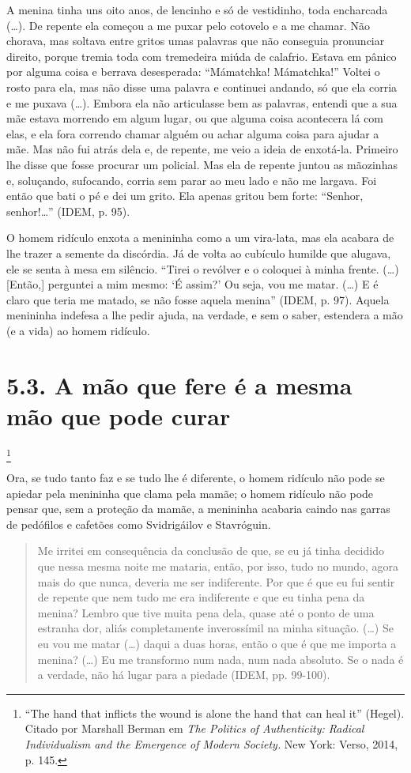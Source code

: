 A menina tinha uns oito anos, de lencinho e só de vestidinho, toda
encharcada (\ldots{}). De repente ela começou a me puxar pelo cotovelo e
a me chamar. Não chorava, mas soltava entre gritos umas palavras que não
conseguia pronunciar direito, porque tremia toda com tremedeira miúda de
calafrio. Estava em pânico por alguma coisa e berrava desesperada:
``Mámatchka! Mámatchka!'' Voltei o rosto para ela, mas não disse uma
palavra e continuei andando, só que ela corria e me puxava (\ldots{}).
Embora ela não articulasse bem as palavras, entendi que a sua mãe estava
morrendo em algum lugar, ou que alguma coisa acontecera lá com elas, e
ela fora correndo chamar alguém ou achar alguma coisa para ajudar a mãe.
Mas não fui atrás dela e, de repente, me veio a ideia de enxotá-la.
Primeiro lhe disse que fosse procurar um policial. Mas ela de repente
juntou as mãozinhas e, soluçando, sufocando, corria sem parar ao meu
lado e não me largava. Foi então que bati o pé e dei um grito. Ela
apenas gritou bem forte: ``Senhor, senhor!\ldots{}'' (IDEM, p. 95).

O homem ridículo enxota a menininha como a um vira-lata, mas ela acabara
de lhe trazer a semente da discórdia. Já de volta ao cubículo humilde
que alugava, ele se senta à mesa em silêncio. ``Tirei o revólver e o
coloquei à minha frente. (\ldots{}) {[}Então,{]} perguntei a mim mesmo:
`É assim?' Ou seja, vou me matar. (\ldots{}) E é claro que teria me
matado, se não fosse aquela menina'' (IDEM, p. 97). Aquela menininha
indefesa a lhe pedir ajuda, na verdade, e sem o saber, estendera a mão
(e a vida) ao homem ridículo.

\section{5.3. A mão que fere é a mesma mão que pode curar}\footnote{``The
  hand that inflicts the wound is alone the hand that can heal it''
  (Hegel). Citado por Marshall Berman em \emph{The Politics of
  Authenticity: Radical Individualism and the Emergence of Modern
  Society.} New York: Verso, 2014, p. 145.}

Ora, se tudo tanto faz e se tudo lhe é diferente, o homem ridículo não
pode se apiedar pela menininha que clama pela mamãe; o homem ridículo
não pode pensar que, sem a proteção da mamãe, a menininha acabaria
caindo nas garras de pedófilos e cafetões como Svidrigáilov e
Stavróguin.

\begin{quote}
Me irritei em consequência da conclusão de que, se eu já tinha decidido
que nessa mesma noite me mataria, então, por isso, tudo no mundo, agora
mais do que nunca, deveria me ser indiferente. Por que é que eu fui
sentir de repente que nem tudo me era indiferente e que eu tinha pena da
menina? Lembro que tive muita pena dela, quase até o ponto de uma
estranha dor, aliás completamente inverossímil na minha situação.
(\ldots{}) Se eu vou me matar (\ldots{}) daqui a duas horas, então o que
é que me importa a menina? (\ldots{}) Eu me transformo num nada, num
nada absoluto. Se o nada é a verdade, não há lugar para a piedade (IDEM,
pp. 99-100).
\end{quote}

